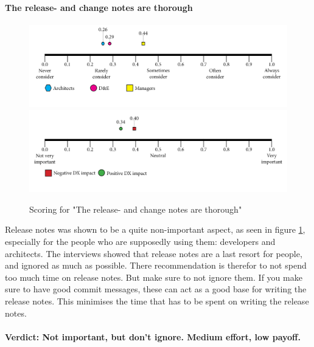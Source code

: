     \paragraph{The release- and change notes are thorough}
    \begin{figure}[H]
        \centering
        \includegraphics[width=\linewidth]{scorelines/aspect10.png}
        \includegraphics[width=\linewidth]{dxscorelines/dxaspect10.png}
        \caption{Scoring for "The release- and change notes are thorough"}
        \label{fig:aspect10}
    \end{figure}
    Release notes was shown to be a quite non-important aspect, as seen in figure \ref{fig:aspect10}, especially for the people who are supposedly using them: developers and architects. The interviews showed that release notes are a last resort for people, and ignored as much as possible. There recommendation is therefor to not spend too much time on release notes. But make sure to not ignore them. If you make sure to have good commit messages, these can act as a good base for writing the release notes. This minimises the time that has to be spent on writing the release notes.\\ \\
    \textbf{Verdict: Not important, but don't ignore. Medium effort, low payoff.}
    

